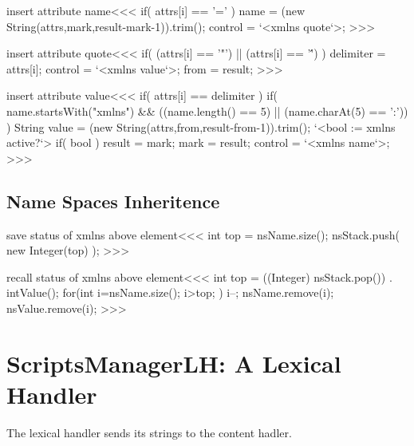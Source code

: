 \documentclass{article}
\begin{document}
\<insert attribute name\><<<
if( attrs[i] == '=' ){
   name = (new String(attrs,mark,result-mark-1)).trim();
   control = `<xmlns quote`>;   
} 
>>>

\<insert attribute quote\><<<
if( (attrs[i] == '"') || (attrs[i] == '\'') ){
   delimiter = attrs[i];
   control = `<xmlns value`>;
   from = result;
}
>>>

\<insert attribute value\><<<
if( attrs[i] == delimiter ){
   if( name.startsWith("xmlns") 
       && ((name.length() == 5) || (name.charAt(5) == ':')) ){
      String value = (new String(attrs,from,result-from-1)).trim();
      `<bool := xmlns active?`>
      if( bool ){ result = mark; }
   }
   mark = result;
   control = `<xmlns name`>;
} 
>>>



\subsection{Name Spaces Inheritence}





\<save status of xmlns above element\><<<
int top = nsName.size();
nsStack.push( new Integer(top) );
>>>

\<recall status of xmlns above element\><<<
int top = ((Integer) nsStack.pop()) . intValue();
for(int i=nsName.size(); i>top; ){
  i--;
  nsName.remove(i);
  nsValue.remove(i);
}
>>>

















\section{ScriptsManagerLH: A Lexical Handler}

\label{ScriptsManagerLH}


The lexical handler sends its strings to the content hadler.




\end{document}
